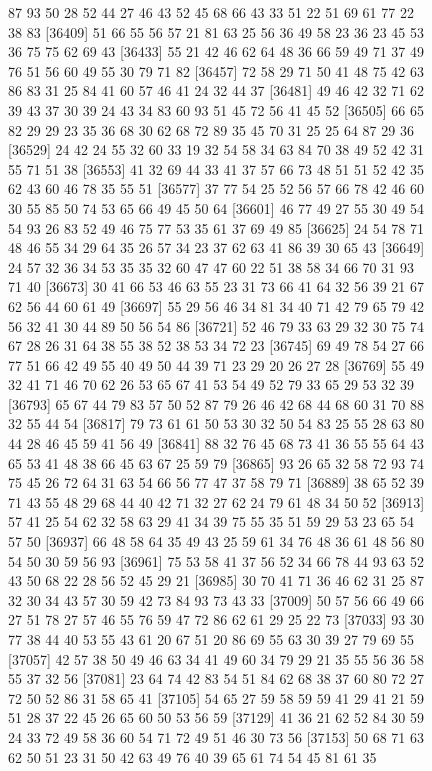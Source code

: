 \documentclass{article}
\begin{document}
\begin{figure}[H]
\begin{Schunk}
\begin{Soutput}
[36385] 87 93 50 28 52 44 27 46 43 52 45 68 66 43 33 51 22 51 69 61 77 22 38 83
[36409] 51 66 55 56 57 21 81 63 25 56 36 49 58 23 36 23 45 53 36 75 75 62 69 43
[36433] 55 21 42 46 62 64 48 36 66 59 49 71 37 49 76 51 56 60 49 55 30 79 71 82
[36457] 72 58 29 71 50 41 48 75 42 63 86 83 31 25 84 41 60 57 46 41 24 32 44 37
[36481] 49 46 42 32 71 62 39 43 37 30 39 24 43 34 83 60 93 51 45 72 56 41 45 52
[36505] 66 65 82 29 29 23 35 36 68 30 62 68 72 89 35 45 70 31 25 25 64 87 29 36
[36529] 24 42 24 55 32 60 33 19 32 54 58 34 63 84 70 38 49 52 42 31 55 71 51 38
[36553] 41 32 69 44 33 41 37 57 66 73 48 51 51 52 42 35 62 43 60 46 78 35 55 51
[36577] 37 77 54 25 52 56 57 66 78 42 46 60 30 55 85 50 74 53 65 66 49 45 50 64
[36601] 46 77 49 27 55 30 49 54 54 93 26 83 52 49 46 75 77 53 35 61 37 69 49 85
[36625] 24 54 78 71 48 46 55 34 29 64 35 26 57 34 23 37 62 63 41 86 39 30 65 43
[36649] 24 57 32 36 34 53 35 35 32 60 47 47 60 22 51 38 58 34 66 70 31 93 71 40
[36673] 30 41 66 53 46 63 55 23 31 73 66 41 64 32 56 39 21 67 62 56 44 60 61 49
[36697] 55 29 56 46 34 81 34 40 71 42 79 65 79 42 56 32 41 30 44 89 50 56 54 86
[36721] 52 46 79 33 63 29 32 30 75 74 67 28 26 31 64 38 55 38 52 38 53 34 72 23
[36745] 69 49 78 54 27 66 77 51 66 42 49 55 40 49 50 44 39 71 23 29 20 26 27 28
[36769] 55 49 32 41 71 46 70 62 26 53 65 67 41 53 54 49 52 79 33 65 29 53 32 39
[36793] 65 67 44 79 83 57 50 52 87 79 26 46 42 68 44 68 60 31 70 88 32 55 44 54
[36817] 79 73 61 61 50 53 30 32 50 54 83 25 55 28 63 80 44 28 46 45 59 41 56 49
[36841] 88 32 76 45 68 73 41 36 55 55 64 43 65 53 41 48 38 66 45 63 67 25 59 79
[36865] 93 26 65 32 58 72 93 74 75 45 26 72 64 31 63 54 66 56 77 47 37 58 79 71
[36889] 38 65 52 39 71 43 55 48 29 68 44 40 42 71 32 27 62 24 79 61 48 34 50 52
[36913] 57 41 25 54 62 32 58 63 29 41 34 39 75 55 35 51 59 29 53 23 65 54 57 50
[36937] 66 48 58 64 35 49 43 25 59 61 34 76 48 36 61 48 56 80 54 50 30 59 56 93
[36961] 75 53 58 41 37 56 52 34 66 78 44 93 63 52 43 50 68 22 28 56 52 45 29 21
[36985] 30 70 41 71 36 46 62 31 25 87 32 30 34 43 57 30 59 42 73 84 93 73 43 33
[37009] 50 57 56 66 49 66 27 51 78 27 57 46 55 76 59 47 72 86 62 61 29 25 22 73
[37033] 93 30 77 38 44 40 53 55 43 61 20 67 51 20 86 69 55 63 30 39 27 79 69 55
[37057] 42 57 38 50 49 46 63 34 41 49 60 34 79 29 21 35 55 56 36 58 55 37 32 56
[37081] 23 64 74 42 83 54 51 84 62 68 38 37 60 80 72 27 72 50 52 86 31 58 65 41
[37105] 54 65 27 59 58 59 59 41 29 41 21 59 51 28 37 22 45 26 65 60 50 53 56 59
[37129] 41 36 21 62 52 84 30 59 24 33 72 49 58 36 60 54 71 72 49 51 46 30 73 56
[37153] 50 68 71 63 62 50 51 23 31 50 42 63 49 76 40 39 65 61 74 54 45 81 61 35

\end{Soutput}
\end{Schunk}
\end{figure}
\end{document}
